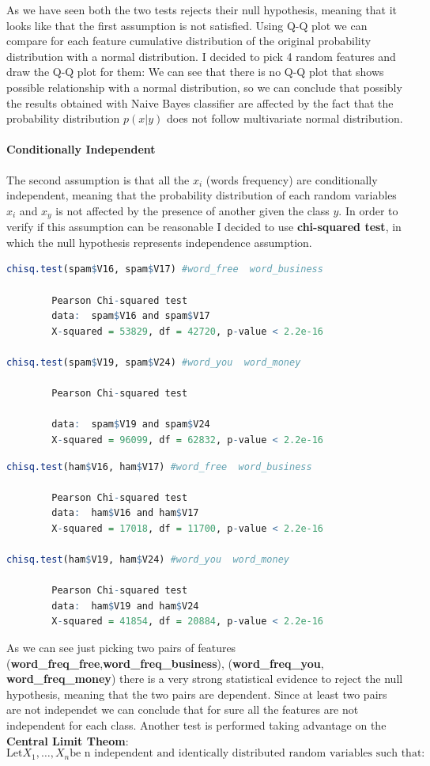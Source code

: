 \documentclass[11pt,a4paper]{article}
\begin{document}
As we have seen both the two tests rejects their null hypothesis, meaning that it looks like that the first assumption is not satisfied. Using Q-Q plot we can compare for each feature cumulative distribution of the original probability distribution with a normal distribution. I decided to pick 4 random features and draw the Q-Q plot for them:
We can see that there is no Q-Q plot that shows possible relationship with a normal distribution, so we can conclude that possibly the results obtained with Naive Bayes classifier are affected by the fact that the probability distribution $p(x|y)$ does not follow multivariate normal distribution.


\paragraph{Conditionally Independent} The second assumption is that all the $x_i$ (words frequency) are conditionally independent, meaning that the probability distribution of each random variables $x_i$ and $x_y$ is not affected by the presence of another given the class $y$. In order to verify if this assumption can be reasonable I decided to use \textbf{chi-squared test}, in which the null hypothesis represents independence assumption.
\begin{lstlisting}[language=R]
chisq.test(spam$V16, spam$V17) #word_free  word_business

		Pearson Chi-squared test
		data:  spam$V16 and spam$V17
		X-squared = 53829, df = 42720, p-value < 2.2e-16

chisq.test(spam$V19, spam$V24) #word_you  word_money
		
		Pearson Chi-squared test
		
		data:  spam$V19 and spam$V24
		X-squared = 96099, df = 62832, p-value < 2.2e-16
\end{lstlisting}	




\begin{lstlisting}[language=R]
chisq.test(ham$V16, ham$V17) #word_free  word_business

		Pearson Chi-squared test		
		data:  ham$V16 and ham$V17
		X-squared = 17018, df = 11700, p-value < 2.2e-16

chisq.test(ham$V19, ham$V24) #word_you  word_money

		Pearson Chi-squared test
		data:  ham$V19 and ham$V24
		X-squared = 41854, df = 20884, p-value < 2.2e-16
\end{lstlisting}	
As we can see just picking two pairs of features (\textbf{word\_freq\_free},\textbf{word\_freq\_business}), (\textbf{word\_freq\_you}, \textbf{word\_freq\_money}) there is a very strong statistical evidence to reject the null hypothesis, meaning that the two pairs are dependent. Since at least two pairs are not independet we can conclude that for sure all the features are not independent for each class. Another test is performed taking advantage on the \textbf{Central Limit Theom}:
$$
\text{Let} {X_1,\dots,X_n}  \text{be n  independent and identically distributed random variables such that}:
$$
\end{document}
